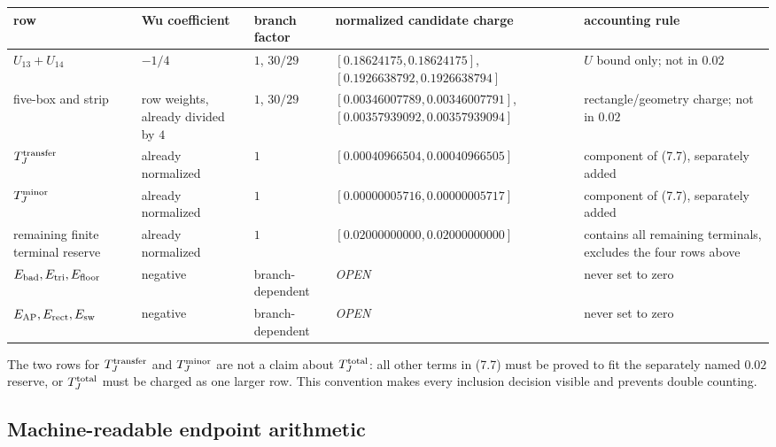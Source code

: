 \documentclass[11pt]{article}
\theoremstyle{definition}
\begin{document}
\begingroup
\scriptsize
\setlength{\tabcolsep}{2pt}
\begin{longtable}{p{}p{}p{}p{}p{}}
\label{tab:ledger-lines}\\
\toprule
row&Wu coefficient&branch factor&normalized candidate charge&accounting rule\\
\midrule
\(U_{13}+U_{14}\)&\(-1/4\)&\(1\), \(30/29\)&
\([0.18624175,0.18624175]\), \([0.1926638792,0.1926638794]\)&
\(U\) bound only; not in \(0.02\)\\
five-box and strip&row weights, already divided by \(4\)&
\(1\), \(30/29\)&
\([0.00346007789,0.00346007791]\),
\([0.00357939092,0.00357939094]\)&
rectangle/geometry charge; not in \(0.02\)\\
\(T_J^{\rm transfer}\)&already normalized&\(1\)&
\([0.00040966504,0.00040966505]\)&
component of (7.7), separately added\\
\(T_J^{\rm minor}\)&already normalized&\(1\)&
\([0.00000005716,0.00000005717]\)&
component of (7.7), separately added\\
remaining finite terminal reserve&already normalized&\(1\)&
\([0.02000000000,0.02000000000]\)&
contains all remaining terminals, excludes the four rows above\\
\(E_{\rm bad},E_{\rm tri},E_{\rm floor}\)&negative&branch-dependent&
\textit{OPEN}&never set to zero\\
\(E_{\rm AP},E_{\rm rect},E_{\rm sw}\)&negative&branch-dependent&
\textit{OPEN}&never set to zero\\
\bottomrule
\end{longtable}
\endgroup
The two rows for \(T_J^{\rm transfer}\) and \(T_J^{\rm minor}\) are not a
claim about \(T_J^{\rm total}\): all other terms in (7.7) must be proved to
fit the separately named \(0.02\) reserve, or \(T_J^{\rm total}\) must be
charged as one larger row.  This convention makes every inclusion decision
visible and prevents double counting.

\subsection{Machine-readable endpoint arithmetic}
\label{sec:ledger-arithmetic}
\end{document}
